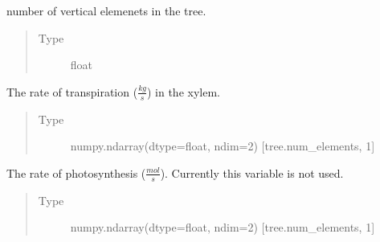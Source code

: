 \documentclass[letterpaper,10pt,english]{sphinxmanual}
\begin{document}
\begin{fulllineitems}
\begin{fulllineitems}
\label{\detokenize{index:src.tree.Tree.num_elements}}
number of vertical elemenets in the tree.
\begin{quote}\begin{description}
\item[{Type}] \leavevmode
float

\end{description}\end{quote}

\end{fulllineitems}


\begin{fulllineitems}
\label{\detokenize{index:src.tree.Tree.transpiration_rate}}
The rate of transpiration
(\(\frac{kg}{s}\)) in the xylem.
\begin{quote}\begin{description}
\item[{Type}] \leavevmode
numpy.ndarray(dtype=float, ndim=2) {[}tree.num\_elements, 1{]}

\end{description}\end{quote}

\end{fulllineitems}


\begin{fulllineitems}
\label{\detokenize{index:src.tree.Tree.photosynthesis_rate}}
The rate of photosynthesis
(\(\frac{mol}{s}\)). Currently this variable is not used.
\begin{quote}\begin{description}
\item[{Type}] \leavevmode
numpy.ndarray(dtype=float, ndim=2) {[}tree.num\_elements, 1{]}

\end{description}\end{quote}

\end{fulllineitems}


\end{fulllineitems}
\end{document}
